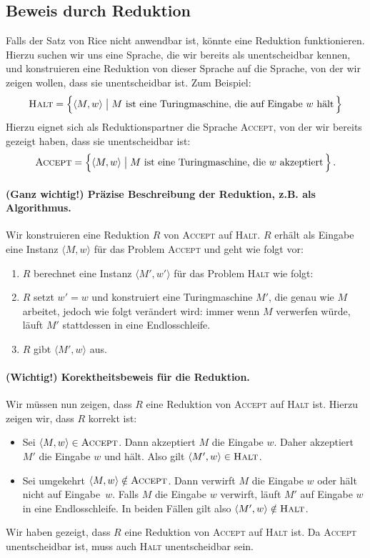 \documentclass[a4paper,11pt,oneside,ngerman]{scrartcl}
\begin{document}
\subsection{Beweis durch Reduktion}

Falls der Satz von Rice nicht anwendbar ist, könnte eine Reduktion funktionieren. Hierzu suchen wir uns eine Sprache, die wir bereits als unentscheidbar kennen, und konstruieren eine Reduktion von dieser Sprache auf die Sprache, von der wir zeigen wollen, dass sie unentscheidbar ist. Zum Beispiel:
\[
    \textsc{Halt} = \Big\{\langle M,w\rangle\;\big|\; \text{$M$ ist eine Turingmaschine, die auf Eingabe $w$ hält}\,\Big\}
\]
Hierzu eignet sich als Reduktionspartner die Sprache \textsc{Accept}, von der wir bereits gezeigt haben, dass sie unentscheidbar ist:
\[
    \textsc{Accept} = \Big\{\langle M,w\rangle\;\big|\; \text{$M$ ist eine Turingmaschine, die $w$ akzeptiert}\,\Big\}\,.
\]

\paragraph*{(Ganz wichtig!) Präzise Beschreibung der Reduktion, z.B. als Algorithmus.}
Wir konstruieren eine Reduktion $R$ von \textsc{Accept} auf \textsc{Halt}.
$R$ erhält als Eingabe eine Instanz $\langle M,w\rangle$ für das Problem \textsc{Accept} und geht wie folgt vor:
\begin{enumerate}
    \item $R$ berechnet eine Instanz $\langle M',w'\rangle$ für das Problem \textsc{Halt} wie folgt:
    \item $R$ setzt $w'=w$ und konstruiert eine Turingmaschine $M'$, die genau wie $M$ arbeitet, jedoch wie folgt verändert wird: immer wenn $M$ verwerfen würde, läuft $M'$ stattdessen in eine Endlosschleife.
    \item $R$ gibt $\langle M',w\rangle$ aus.
\end{enumerate}

\paragraph*{(Wichtig!) Korektheitsbeweis für die Reduktion.}
Wir müssen nun zeigen, dass $R$ eine Reduktion von \textsc{Accept} auf \textsc{Halt} ist. Hierzu zeigen wir, dass $R$ korrekt ist:
\begin{itemize}
    \item Sei $\langle M,w\rangle\in\textsc{Accept}$. Dann akzeptiert $M$ die Eingabe $w$. Daher akzeptiert $M'$ die Eingabe $w$ und hält. Also gilt $\langle M',w\rangle\in\textsc{Halt}$.
    \item Sei umgekehrt $\langle M,w\rangle\notin\textsc{Accept}$. Dann verwirft $M$ die Eingabe $w$ oder hält nicht auf Eingabe~$w$. Falls $M$ die Eingabe $w$ verwirft, läuft $M'$ auf Eingabe $w$ in eine Endlosschleife. In beiden Fällen gilt also $\langle M',w\rangle\notin\textsc{Halt}$.
\end{itemize}
Wir haben gezeigt, dass $R$ eine Reduktion von \textsc{Accept} auf \textsc{Halt} ist. Da \textsc{Accept} unentscheidbar ist, muss auch \textsc{Halt} unentscheidbar sein.
\end{document}
